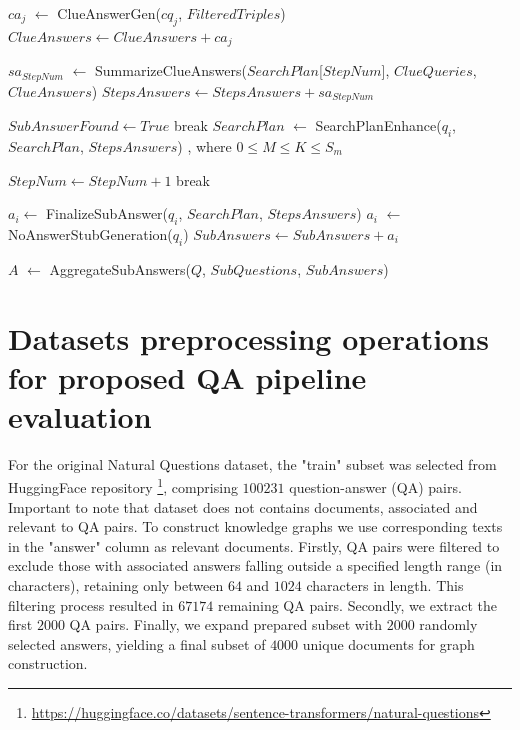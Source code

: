 \begin{algorithm}[H]
\begin{algorithmic}[1]
                \State $ca_j$ $\leftarrow$ ClueAnswerGen($cq_j$, $FilteredTriples$)
                \State $ClueAnswers \leftarrow ClueAnswers + ca_j$    
            \EndFor
            
            \State $sa_{StepNum}$ $\leftarrow$ SummarizeClueAnswers($SearchPlan$[$StepNum$], $ClueQueries$, $ClueAnswers$)
            \State $StepsAnswers \leftarrow StepsAnswers + sa_{StepNum}$ 
            
                
                \State $SubAnswerFound \leftarrow True$
                \State break
            \Else
                \State $SearchPlan$ $\leftarrow$ SearchPlanEnhance($q_i$, $SearchPlan$, $StepsAnswers$) \Comment{$[s_1, s_2, ..., s_K]$}, where $0 \leq M \leq K \leq S_m$

                \State $StepNum \leftarrow StepNum + 1$ 
                    \State break
                \EndIf
            \EndIf
        \EndWhile

        
            \State $a_i \leftarrow$ FinalizeSubAnswer($q_i$, $SearchPlan$, $StepsAnswers$)  
        \Else
            \State $a_i$ $\leftarrow$ NoAnswerStubGeneration($q_i$) 
        \EndIf
        \State $SubAnswers \leftarrow SubAnswers + a_i$
    \EndFor
    
    \State $A$ $\leftarrow$ AggregateSubAnswers($Q$, $SubQuestions$, $SubAnswers$)
\end{algorithmic}
\caption{PAI-2 QA pipeline}
\label{alg:medium_pipeline_pseudocode}
\end{algorithm}


\section{Datasets preprocessing operations for proposed QA pipeline evaluation}
\label{app:datasets}
For the original Natural Questions dataset, the "train" subset was selected from HuggingFace repository \footnote{\url{https://huggingface.co/datasets/sentence-transformers/natural-questions}}, comprising $100231$ question-answer (QA) pairs. Important to note that dataset does not contains documents, associated and relevant to QA pairs. To construct knowledge graphs we use corresponding texts in the "answer" column as relevant documents. Firstly, QA pairs were filtered to exclude those with associated answers falling outside a specified length range (in characters), retaining only between $64$ and $1024$ characters in length. This filtering process resulted in $67174$ remaining QA pairs. Secondly, we extract the first $2000$ QA pairs. Finally, we expand prepared subset with $2000$ randomly selected answers, yielding a final subset of $4000$ unique documents for graph construction.

